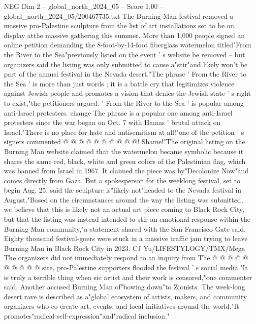 \begin{textsample}{NEG Dim 2 – global\_north\_2024\_05 – Score 1.00 – global\_north\_2024\_05/200467735.txt}  \label{ex:f2_neg_157}
The Burning Man festival removed a massive pro-Palestine sculpture from the list of art installations set to be on display atthe massive gathering this summer.
More than 1,000 people signed an online petition demanding the 8-foot-by-14-foot fiberglass watermelon titled"From the River to the Sea"previously listed on the event ' s website be removed -- but organizers said the listing was only submitted to cause a"stir"and likely won't be part of the annual festival in the Nevada desert."The phrase ' From the River to the Sea ' is more than just words ; it is a battle cry that legitimizes violence against Jewish people and promotes a vision that denies the Jewish state ' s right to exist,"the petitioners argued. ' From the River to the Sea ' is popular among anti-Israel protesters. change The phrase is a popular one among anti-Israel protesters since the war began on Oct. 7 with Hamas ' brutal attack on Israel."There is no place for hate and antisemitism at all!"one of the petition ' s signers commented @ @ @ @ @ @ @ @ @ @!
Shame!"The original listing on the Burning Man website claimed that the watermelon became symbolic because it shares the same red, black, white and green colors of the Palestinian flag, which was banned from Israel in 1967.
It claimed the piece was by"Decolonize Now"and comes directly from Gaza.
But a spokesperson for the weeklong festival, set to begin Aug. 25, said the sculpture is"likely not"headed to the Nevada festival in August."Based on the circumstances around the way the listing was submitted, we believe that this is likely not an actual art piece coming to Black Rock City, but that the listing was instead intended to stir an emotional response within the Burning Man community,"a statement shared with the San Francisco Gate said.
Eighty thousand festival-goers were stuck in a massive traffic jam trying to leave Burning Man in Black Rock City in 2023.
CJ Yu/LIFESTYLOGY/TMX/Mega The organizers did not immediately respond to an inquiry from The @ @ @ @ @ @ @ @ @ @ site, pro-Palestine supporters flooded the festival ' s social media."It is truly a terrible thing when sic artist and their work is censored,"one commenter said.
Another accused Burning Man of"bowing down"to Zionists.
The week-long desert rave is described as a"global ecosystem of artists, makers, and community organizers who co-create art, events, and local initiatives around the world."It promotes"radical self-expression"and"radical inclusion."

\end{textsample}
